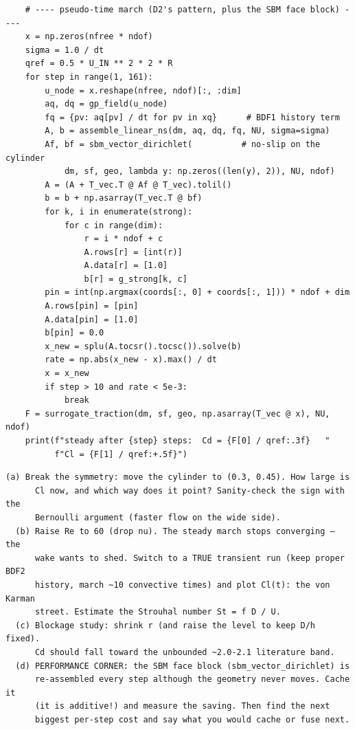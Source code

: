 \begin{lstlisting}
    # ---- pseudo-time march (D2's pattern, plus the SBM face block) ----
    x = np.zeros(nfree * ndof)
    sigma = 1.0 / dt
    qref = 0.5 * U_IN ** 2 * 2 * R
    for step in range(1, 161):
        u_node = x.reshape(nfree, ndof)[:, :dim]
        aq, dq = gp_field(u_node)
        fq = {pv: aq[pv] / dt for pv in xq}      # BDF1 history term
        A, b = assemble_linear_ns(dm, aq, dq, fq, NU, sigma=sigma)
        Af, bf = sbm_vector_dirichlet(          # no-slip on the cylinder
            dm, sf, geo, lambda y: np.zeros((len(y), 2)), NU, ndof)
        A = (A + T_vec.T @ Af @ T_vec).tolil()
        b = b + np.asarray(T_vec.T @ bf)
        for k, i in enumerate(strong):
            for c in range(dim):
                r = i * ndof + c
                A.rows[r] = [int(r)]
                A.data[r] = [1.0]
                b[r] = g_strong[k, c]
        pin = int(np.argmax(coords[:, 0] + coords[:, 1])) * ndof + dim
        A.rows[pin] = [pin]
        A.data[pin] = [1.0]
        b[pin] = 0.0
        x_new = splu(A.tocsr().tocsc()).solve(b)
        rate = np.abs(x_new - x).max() / dt
        x = x_new
        if step > 10 and rate < 5e-3:
            break
    F = surrogate_traction(dm, sf, geo, np.asarray(T_vec @ x), NU, ndof)
    print(f"steady after {step} steps:  Cd = {F[0] / qref:.3f}   "
          f"Cl = {F[1] / qref:+.5f}")
\end{lstlisting}

\begin{explore}
\begin{verbatim}
(a) Break the symmetry: move the cylinder to (0.3, 0.45). How large is
      Cl now, and which way does it point? Sanity-check the sign with the
      Bernoulli argument (faster flow on the wide side).
  (b) Raise Re to 60 (drop nu). The steady march stops converging — the
      wake wants to shed. Switch to a TRUE transient run (keep proper BDF2
      history, march ~10 convective times) and plot Cl(t): the von Karman
      street. Estimate the Strouhal number St = f D / U.
  (c) Blockage study: shrink r (and raise the level to keep D/h fixed).
      Cd should fall toward the unbounded ~2.0-2.1 literature band.
  (d) PERFORMANCE CORNER: the SBM face block (sbm_vector_dirichlet) is
      re-assembled every step although the geometry never moves. Cache it
      (it is additive!) and measure the saving. Then find the next
      biggest per-step cost and say what you would cache or fuse next.
\end{verbatim}
\end{explore}
